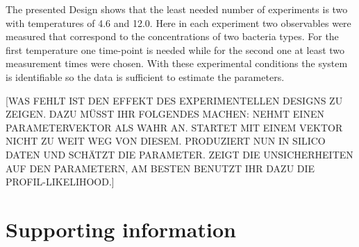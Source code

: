 \documentclass[10pt,A4paper]{article}
\begin{document}
The presented Design shows that the least needed number of experiments is two with temperatures of 4.6 and 12.0. 
Here in each experiment two observables were measured that correspond to the concentrations of two bacteria types. 
For the first temperature one time-point is needed while for the second one at least two measurement times were chosen.
With these experimental conditions the system is identifiable so the data is sufficient to estimate the parameters.

[WAS FEHLT IST DEN EFFEKT DES EXPERIMENTELLEN DESIGNS ZU ZEIGEN. DAZU MÜSST IHR FOLGENDES MACHEN: NEHMT EINEN PARAMETERVEKTOR ALS WAHR AN. STARTET MIT EINEM VEKTOR NICHT ZU WEIT WEG VON DIESEM. PRODUZIERT NUN IN SILICO DATEN UND SCHÄTZT DIE PARAMETER. ZEIGT DIE UNSICHERHEITEN AUF DEN PARAMETERN, AM BESTEN BENUTZT IHR DAZU DIE PROFIL-LIKELIHOOD.]
%
%
%
\section*{Supporting information}
%
%
%
\nolinenumbers

\end{document}
